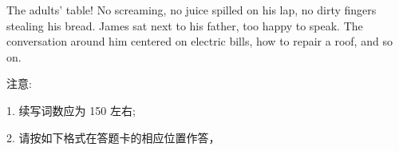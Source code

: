 \documentclass{英语试卷}
\begin{document}
\par The adults' table! No screaming, no juice spilled on his lap, no dirty fingers stealing his bread. James sat next to his father, too happy to speak. The conversation around him centered on electric bills, how to repair a roof, and so on.\par
\par 注意:\par
\par 1. 续写词数应为 150 左右;\par
\par 2. 请按如下格式在答题卡的相应位置作答，\par
{}
\end{document}
